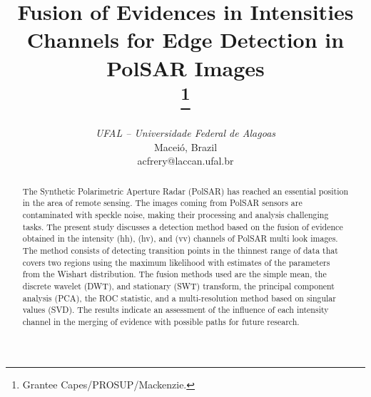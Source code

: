 \documentclass[conference]{IEEEtran}
\begin{document}
\title{Fusion of Evidences in Intensities Channels for Edge Detection in PolSAR Images\\
\thanks{Grantee Capes/PROSUP/Mackenzie.}
}
\author{
\and
{}
\and
{}
\textit{UFAL -- Universidade Federal de Alagoas}\\
Maceió, Brazil \\
acfrery@laccan.ufal.br}
\maketitle
\begin{abstract}
The Synthetic Polarimetric Aperture Radar (PolSAR) has reached an essential position in the area of remote sensing. The images coming from PolSAR sensors are contaminated with speckle noise, making their processing and analysis challenging tasks. The present study discusses a detection method based on the fusion of evidence obtained in the intensity (hh), (hv), and (vv) channels of PolSAR multi look images. The method consists of detecting transition points in the thinnest range of data that covers two regions using the maximum likelihood with estimates of the parameters from the Wishart distribution. The fusion methods used are the simple mean, the discrete wavelet (DWT), and stationary (SWT) transform, the principal component analysis (PCA), the ROC statistic, and a multi-resolution method based on singular values (SVD). The results indicate an assessment of the influence of each intensity channel in the merging of evidence with possible paths for future research.
\end{abstract}
\end{document}
